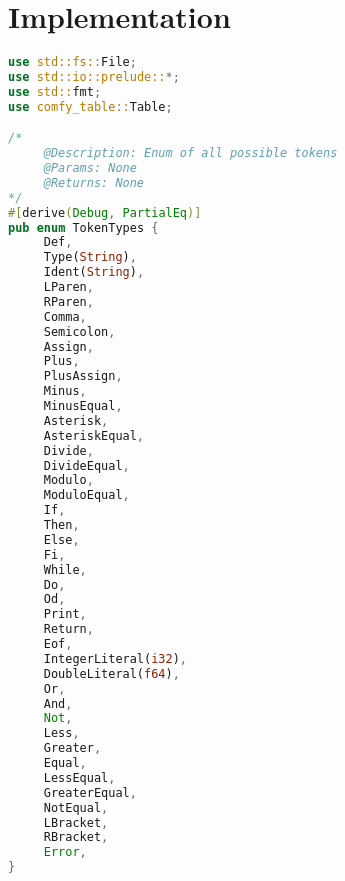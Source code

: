 \documentclass[12pt]{article}
\begin{document}
{    \section {Implementation}
    \begin{lstlisting}[language=Rust]
use std::fs::File;
use std::io::prelude::*;
use std::fmt;
use comfy_table::Table;

/*
     @Description: Enum of all possible tokens
     @Params: None
     @Returns: None
*/
#[derive(Debug, PartialEq)]
pub enum TokenTypes {
     Def,
     Type(String),
     Ident(String),
     LParen,
     RParen,
     Comma,
     Semicolon,
     Assign,
     Plus,
     PlusAssign,
     Minus,
     MinusEqual,
     Asterisk,
     AsteriskEqual,
     Divide,
     DivideEqual,
     Modulo,
     ModuloEqual,
     If,
     Then,
     Else,
     Fi,
     While,
     Do,
     Od,
     Print,
     Return,
     Eof,
     IntegerLiteral(i32),
     DoubleLiteral(f64),
     Or,
     And,
     Not,
     Less,
     Greater,
     Equal,
     LessEqual,
     GreaterEqual,
     NotEqual,
     LBracket,
     RBracket,
     Error,
}


\end{lstlisting}}
\end{document}
